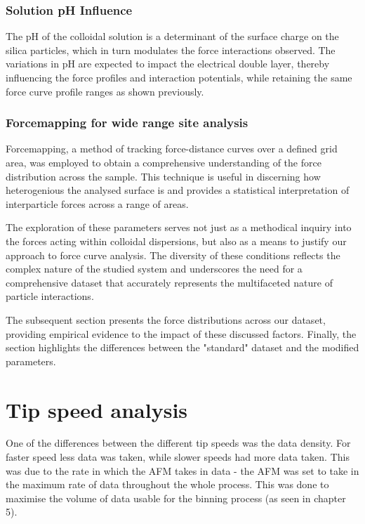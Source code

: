 \subsubsection{Solution pH Influence}

The pH of the colloidal solution is a determinant of the surface charge on the silica particles, which in turn modulates the force interactions observed. The variations in pH are expected to impact the electrical double layer, thereby influencing the force profiles and interaction potentials, while retaining the same force curve profile ranges as shown previously.

\subsubsection{Forcemapping for wide range site analysis}

Forcemapping, a method of tracking force-distance curves over a defined grid area, was employed to obtain a comprehensive understanding of the force distribution across the sample. This technique is useful in discerning how heterogenious the analysed surface is and provides a statistical interpretation of interparticle forces across a range of areas.

The exploration of these parameters serves not just as a methodical inquiry into the forces acting within colloidal dispersions, but also as a means to justify our approach to force curve analysis. The diversity of these conditions reflects the complex nature of the studied system and underscores the need for a comprehensive dataset that accurately represents the multifaceted nature of particle interactions.

The subsequent section presents the force distributions across our dataset, providing empirical evidence to the impact of these discussed factors. Finally, the section highlights the differences between the "standard" dataset and the modified parameters.

\section{Tip speed analysis}

One of the differences between the different tip speeds was the data density. For faster speed less data was taken, while slower speeds had more data taken. This was due to the rate in which the AFM takes in data - the AFM was set to take in the maximum rate of data throughout the whole process. This was done to maximise the volume of data usable for the binning process (as seen in chapter 5). 

